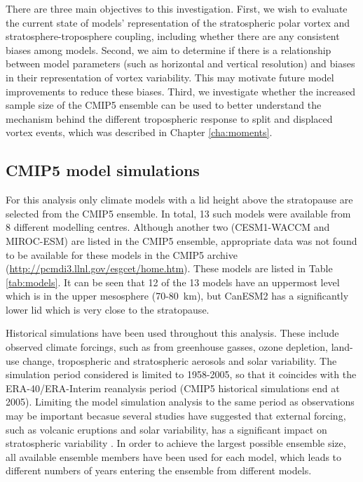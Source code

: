 There are three main objectives to this investigation. First, we wish to
evaluate the current state of models' representation of the stratospheric polar
vortex and stratosphere-troposphere coupling, including whether there are any
consistent biases among models. Second, we aim to determine if there is a
relationship between model parameters (such as horizontal and vertical
resolution) and biases in their representation of vortex variability. This may
motivate future model improvements to reduce these biases. Third, we investigate
whether the increased sample size of the CMIP5 ensemble can be used to better
understand the mechanism behind the different tropospheric response to split and
displaced vortex events, which was described in Chapter \ref{cha:moments}.

\subsection{CMIP5 model simulations}

For this analysis only climate models with a lid height above the stratopause
are selected from the CMIP5 ensemble. In total, 13 such models were available
from 8 different modelling centres. Although another two (CESM1-WACCM and
MIROC-ESM) are listed in the CMIP5 ensemble, appropriate data was not found to
be available for these models in the CMIP5 archive
(\url{http://pcmdi3.llnl.gov/esgcet/home.htm}). These models are listed in Table
\ref{tab:models}. It can be seen that 12 of the 13 models have an uppermost
level which is in the upper mesosphere (70-80~km), but CanESM2 has a
significantly lower lid which is very close to the stratopause.

Historical simulations have been used throughout this analysis. These include
observed climate forcings, such as from greenhouse gasses, ozone depletion,
land-use change, tropospheric and stratospheric aerosols and solar
variability. The simulation period considered is limited to 1958-2005, so that
it coincides with the ERA-40/ERA-Interim reanalysis period (CMIP5 historical
simulations end at 2005). Limiting the model simulation analysis to the same
period as observations may be important becasue several studies have suggested
that external forcing, such as volcanic eruptions and solar variability, has a
significant impact on stratospheric variability
\citep[e.g.,][]{Kodera1994,Gray2010}. In order to achieve the largest possible
ensemble size, all available ensemble members have been used for each model,
which leads to different numbers of years entering the ensemble from different
models.


